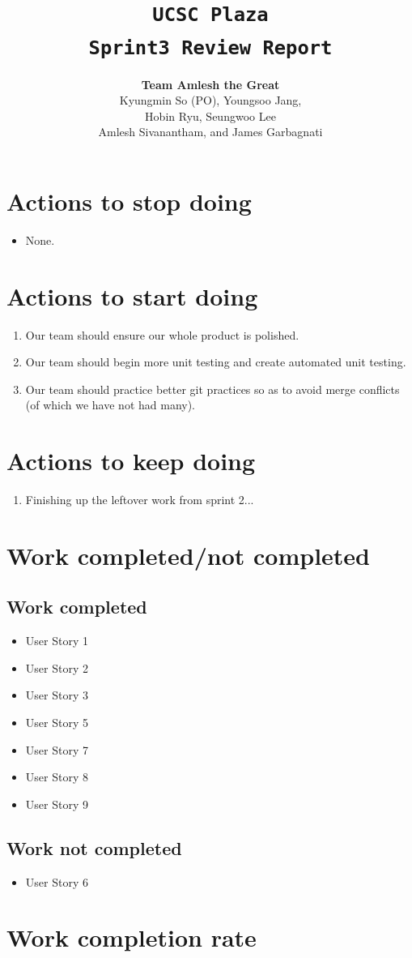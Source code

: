 \documentclass[10pt]{article}
\title{\color{primary}\texttt{UCSC Plaza \\ Sprint3 Review Report}}
\author{{\color{secondary}\textbf{Team Amlesh the Great}} \\ Kyungmin So (PO), Youngsoo Jang, \\ Hobin Ryu, Seungwoo Lee \\ Amlesh Sivanantham, and James Garbagnati }
\newcommand{\fancysecX}[2] {{\color{primary}\section*{#1} \label{sec:#2}}}
\newcommand{\fancysubX}[2] {{\color{primary}\subsection*{#1} \label{sec:#2}}}
\begin{document}
\maketitle
    
\fancysecX{Actions to stop doing}{stop}
     
        \begin{itemize}
            \item None.
        \end{itemize}    

\fancysecX{Actions to start doing}{start}
        \begin{enumerate}
            \item Our team should ensure our whole product is polished.
            \item Our team should begin more unit testing and create automated unit testing.
            \item Our team should practice better git practices so as to avoid merge conflicts (of which we have not had many).
        \end{enumerate}  

\fancysecX{Actions to keep doing}{keep}
     
    \begin{enumerate}
        \item Finishing up the leftover work from sprint 2...
	\end{enumerate}

\fancysecX{Work completed/not completed}{completeWork}

	\fancysubX{Work completed}{completed}
		\begin{itemize}
            \item User Story 1
            \item User Story 2
            \item User Story 3
            \item User Story 5
            \item User Story 7
            \item User Story 8
            \item User Story 9
    	\end{itemize}

    \fancysubX{Work not completed}{notCompleted}
		\begin{itemize}
            \item User Story 6
    	\end{itemize}

\fancysecX{Work completion rate}{completeRate}
\end{document}
